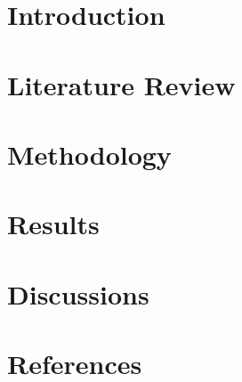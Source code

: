 \documentclass[conference]{IEEEtran}
\begin{document}
\section{Introduction}

\section{Literature Review}

\section{Methodology}

\section{Results}

\section{Discussions}

\section{References}


\vspace{12pt}
\end{document}
